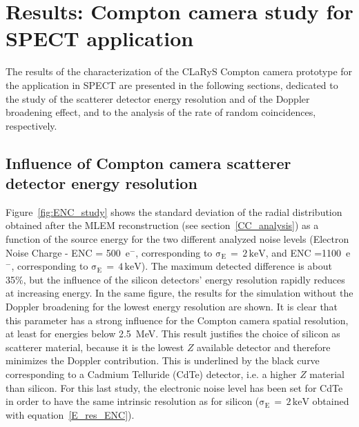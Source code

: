 \section{Results: Compton camera study for SPECT application}\label{Results_CC_SPECT}
The results of the characterization of the CLaRyS Compton camera prototype for the application in SPECT are presented in the following sections, dedicated to the study of the scatterer detector energy resolution and of the Doppler broadening effect, and to the analysis of the rate of random coincidences, respectively.

\subsection{Influence of Compton camera scatterer detector energy resolution}
Figure~\ref{fig:ENC_study} shows the standard deviation of the radial distribution obtained after the MLEM reconstruction (see section~\ref{CC_analysis}) as a function of the source energy for the two different analyzed noise levels (Electron Noise Charge - ENC = 500~e$^-$, corresponding to $\mathrm{\sigma_{E}\,=\,2\,keV}$, and ENC =1100~e$^-$, corresponding to $\mathrm{\sigma_{E}\,=\,4\,keV}$). The maximum detected difference is about 35\%, but the influence of the silicon detectors' energy resolution rapidly reduces at increasing energy. In the same figure, the results for the simulation without the Doppler broadening for the lowest energy resolution are shown. It is clear that this parameter has a strong influence for the Compton camera spatial resolution, at least for energies below 2.5~MeV. This result justifies the choice of silicon as scatterer material, because it is the lowest $Z$ available detector and therefore minimizes the Doppler contribution. This is underlined by the black curve corresponding to a Cadmium Telluride (CdTe) detector, i.e. a higher $Z$ material than silicon. For this last study, the electronic noise level has been set for CdTe in order to have the same intrinsic resolution as for silicon ($\mathrm{\sigma_{E}\,=\,2\,keV}$ obtained with equation~\ref{E_res_ENC}).

